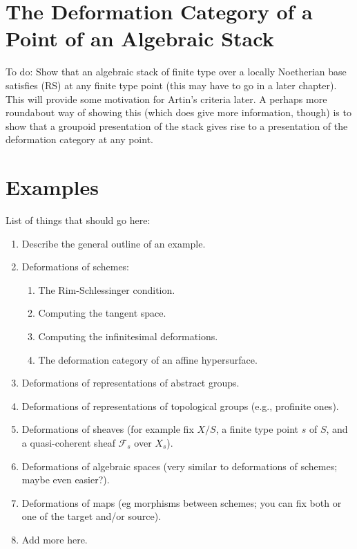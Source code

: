 \section{The Deformation Category of a Point of an Algebraic Stack}
\label{section-algebraic-stacks}

\noindent
To do: Show that an algebraic stack of finite type over a locally Noetherian
base satisfies (RS) at any finite type point (this may have to go in a later
chapter). This will provide some motivation for Artin's criteria later.
A perhaps more roundabout  way of showing this (which does give more
information, though) is to show that a groupoid presentation of the stack
gives rise to a presentation of the deformation category at any point.




\section{Examples}
\label{section-examples}

\noindent
List of things that should go here:
\begin{enumerate}
\item Describe the general outline of an example.
\item Deformations of schemes:
\begin{enumerate}
\item The Rim-Schlessinger condition.
\item Computing the tangent space.
\item Computing the infinitesimal deformations.
\item The deformation category of an affine hypersurface.
\end{enumerate}
\item Deformations of representations of abstract groups.
\item Deformations of representations of topological groups
(e.g., profinite ones).
\item Deformations of sheaves (for example fix $X/S$, a finite type point
$s$ of $S$, and a quasi-coherent sheaf $\mathcal{F}_s$ over $X_s$).
\item Deformations of algebraic spaces (very similar to deformations
of schemes; maybe even easier?).
\item Deformations of maps (eg morphisms between schemes; you can fix
both or one of the target and/or source).
\item Add more here.
\end{enumerate}








